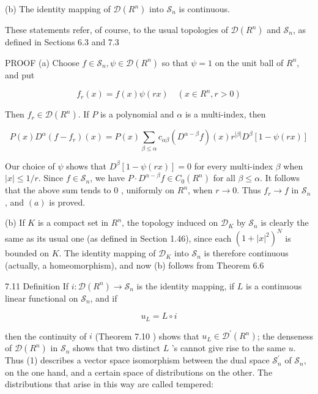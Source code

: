 \documentclass[10pt]{article}
\begin{document}
(b) The identity mapping of $\mathscr{D}\left(R^{n}\right)$ into $\mathscr{S}_{n}$ is continuous.

These statements refer, of course, to the usual topologies of $\mathscr{D}\left(R^{n}\right)$ and $\mathscr{S}_{n}$, as defined in Sections 6.3 and 7.3

PROOF (a) Choose $f \in \mathscr{S}_{n}, \psi \in \mathscr{D}\left(R^{n}\right)$ so that $\psi=1$ on the unit ball of $R^{n}$, and put

$$
f_{r}(x)=f(x) \psi(r x) \quad\left(x \in R^{n}, r>0\right)
$$

Then $f_{r} \in \mathscr{D}\left(R^{n}\right)$. If $P$ is a polynomial and $\alpha$ is a multi-index, then

$$
P(x) D^{\alpha}\left(f-f_{r}\right)(x)=P(x) \sum_{\beta \leq \alpha} c_{\alpha \beta}\left(D^{\alpha-\beta} f\right)(x) r^{|\beta|} D^{\beta}[1-\psi(r x)]
$$

Our choice of $\psi$ shows that $D^{\beta}[1-\psi(r x)]=0$ for every multi-index $\beta$ when $|x| \leq 1 / r$. Since $f \in \mathscr{S}_{n}$, we have $P \cdot D^{\alpha-\beta} f \in C_{0}\left(R^{n}\right)$ for all $\beta \leq \alpha$. It follows that the above sum tends to 0 , uniformly on $R^{n}$, when $r \rightarrow 0$. Thus $f_{r} \rightarrow f$ in $\mathscr{S}_{n}$, and $(a)$ is proved.

(b) If $K$ is a compact set in $R^{n}$, the topology induced on $\mathscr{D}_{K}$ by $\mathscr{S}_{n}$ is clearly the same as its usual one (as defined in Section 1.46), since each $\left(1+|x|^{2}\right)^{N}$ is bounded on $K$. The identity mapping of $\mathscr{D}_{K}$ into $\mathscr{S}_{n}$ is therefore continuous (actually, a homeomorphism), and now (b) follows from Theorem 6.6

7.11 Definition If $i: \mathscr{D}\left(R^{n}\right) \rightarrow \mathscr{S}_{n}$ is the identity mapping, if $L$ is a continuous linear functional on $\mathscr{S}_{n}$, and if

$$
u_{L}=L \circ i
$$

then the continuity of $i$ (Theorem 7.10 ) shows that $u_{L} \in \mathscr{D}^{\prime}\left(R^{n}\right)$; the denseness of $\mathscr{D}\left(R^{n}\right)$ in $\mathscr{S}_{n}$ shows that two distinct $L$ 's cannot give rise to the same $u$. Thus (1) describes a vector space isomorphism between the dual space $\mathscr{S}_{n}^{\prime}$ of $\mathscr{S}_{n}$, on the one hand, and a certain space of distributions on the other. The distributions that arise in this way are called tempered:
\end{document}
